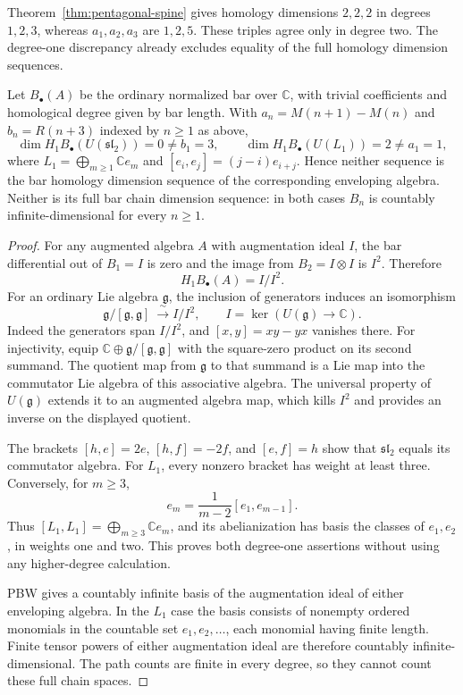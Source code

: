 \begin{remark}
Theorem~\ref{thm:pentagonal-spine} gives homology dimensions $2,2,2$ in degrees $1,2,3$, whereas $a_1,a_2,a_3$ are $1,2,5$. These triples agree only in degree two. The degree-one discrepancy already excludes equality of the full homology dimension sequences.
\end{remark}

\begin{theorem}
\label{thm:carrier-spine}
Let $B_\bullet(A)$ be the ordinary normalized bar over $\mathbb C$, with
trivial coefficients and homological degree given by bar length.  With
$a_n=M(n+1)-M(n)$ and $b_n=R(n+3)$ indexed by $n\ge1$ as above,
\[
 \dim H_1 B_\bullet(U(\mathfrak{sl}_2))=0\ne b_1=3,
 \qquad
 \dim H_1 B_\bullet(U(L_1))=2\ne a_1=1,
\]
where $L_1=\bigoplus_{m\ge1}\mathbb C e_m$ and
$[e_i,e_j]=(j-i)e_{i+j}$.
Hence neither sequence is the bar homology dimension sequence of the
corresponding enveloping algebra.  Neither is its full bar chain dimension
sequence: in both cases $B_n$ is countably infinite-dimensional for every
$n\ge1$.
\end{theorem}
\begin{proof}
For any augmented algebra $A$ with augmentation ideal $I$, the bar
differential out of $B_1=I$ is zero and the image from $B_2=I\otimes I$ is
$I^2$.  Therefore
\[
 H_1B_\bullet(A)=I/I^2.
\]
For an ordinary Lie algebra $\mathfrak g$, the inclusion of generators
induces an isomorphism
\[
 \mathfrak g/[\mathfrak g,\mathfrak g]\ \xrightarrow{\ \sim\ }
 I/I^2,\qquad I=\ker(U(\mathfrak g)\to\mathbb C).
\]
Indeed the generators span $I/I^2$, and
$[x,y]=xy-yx$ vanishes there.  For injectivity, equip
$\mathbb C\oplus\mathfrak g/[\mathfrak g,\mathfrak g]$ with the square-zero
product on its second summand.  The quotient map from $\mathfrak g$ to that
summand is a Lie map into the commutator Lie algebra of this associative
algebra.  The universal property of $U(\mathfrak g)$ extends it to an
augmented algebra map, which kills $I^2$ and provides an inverse on the
displayed quotient.

The brackets $[h,e]=2e$, $[h,f]=-2f$, and $[e,f]=h$ show that
$\mathfrak{sl}_2$ equals its commutator algebra.  For $L_1$, every nonzero
bracket has weight at least three.  Conversely, for $m\ge3$,
\[
 e_m=\frac{1}{m-2}[e_1,e_{m-1}].
\]
Thus $[L_1,L_1]=\bigoplus_{m\ge3}\mathbb C e_m$, and its abelianization
has basis the classes of $e_1,e_2$, in weights one and two.  This proves
both degree-one assertions without using any higher-degree calculation.

PBW gives a countably infinite basis of the augmentation ideal of either
enveloping algebra.  In the $L_1$ case the basis consists of nonempty
ordered monomials in the countable set $e_1,e_2,\ldots$, each monomial
having finite length.  Finite tensor powers of either augmentation ideal
are therefore countably infinite-dimensional.  The path counts are finite
in every degree, so they cannot count these full chain spaces.
\end{proof}

